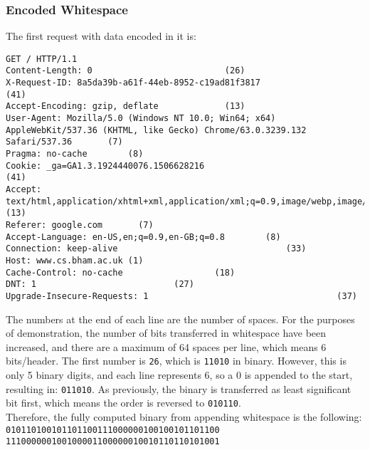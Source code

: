 \subsubsection{Encoded Whitespace}
The first request with data encoded in it is:
\begin{lstlisting}[basicstyle={\ttfamily},breaklines=true,numbers=none,showstringspaces=true,showlines=true,showspaces=false]
GET / HTTP/1.1
Content-Length: 0                          (26)
X-Request-ID: 8a5da39b-a61f-44eb-8952-c19ad81f3817                                         (41)
Accept-Encoding: gzip, deflate             (13)
User-Agent: Mozilla/5.0 (Windows NT 10.0; Win64; x64) AppleWebKit/537.36 (KHTML, like Gecko) Chrome/63.0.3239.132 Safari/537.36       (7)
Pragma: no-cache        (8)
Cookie: _ga=GA1.3.1924440076.1506628216                                         (41)
Accept: text/html,application/xhtml+xml,application/xml;q=0.9,image/webp,image/apng,*/*;q=0.8             (13)
Referer: google.com       (7)
Accept-Language: en-US,en;q=0.9,en-GB;q=0.8        (8)
Connection: keep-alive                                 (33)
Host: www.cs.bham.ac.uk (1)
Cache-Control: no-cache                  (18)
DNT: 1                           (27)
Upgrade-Insecure-Requests: 1                                     (37)

\end{lstlisting}
The numbers at the end of each line are the number of spaces.
For the purposes of demonstration, the number of bits transferred in whitespace have been increased, and there are a maximum of 64 spaces per line, which means 6 bits/header.
The first number is \texttt{26}, which is \texttt{11010} in binary.
However, this is only 5 binary digits, and each line represents 6, so a 0 is appended to the start, resulting in: \texttt{011010}. As previously, the binary is transferred as least significant bit first, which means the order is reversed to \texttt{010110}.\\
Therefore, the fully computed binary from appending whitespace is the following:\\
\texttt{010110100101101100111000000100100101101100\\
111000000100100001100000010010110110101001}\\
\vspace{0.3cm}
